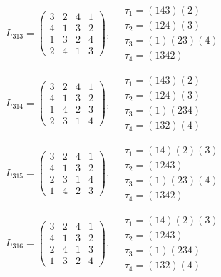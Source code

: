 $L_{313} = \begin{pmatrix} 3 & 2 & 4 & 1 \\ 4 & 1 & 3 & 2 \\ 1 & 3 & 2 & 4 \\ 2 & 4 & 1 & 3 \end{pmatrix}, \quad \begin{matrix} \tau_{1} = (1 4 3)(2) \\ \tau_{2} = (1 2 4)(3) \\ \tau_{3} = (1)(2 3)(4) \\ \tau_{4} = (1 3 4 2) \end{matrix}$

$L_{314} = \begin{pmatrix} 3 & 2 & 4 & 1 \\ 4 & 1 & 3 & 2 \\ 1 & 4 & 2 & 3 \\ 2 & 3 & 1 & 4 \end{pmatrix}, \quad \begin{matrix} \tau_{1} = (1 4 3)(2) \\ \tau_{2} = (1 2 4)(3) \\ \tau_{3} = (1)(2 3 4) \\ \tau_{4} = (1 3 2)(4) \end{matrix}$

$L_{315} = \begin{pmatrix} 3 & 2 & 4 & 1 \\ 4 & 1 & 3 & 2 \\ 2 & 3 & 1 & 4 \\ 1 & 4 & 2 & 3 \end{pmatrix}, \quad \begin{matrix} \tau_{1} = (1 4)(2)(3) \\ \tau_{2} = (1 2 4 3) \\ \tau_{3} = (1)(2 3)(4) \\ \tau_{4} = (1 3 4 2) \end{matrix}$

$L_{316} = \begin{pmatrix} 3 & 2 & 4 & 1 \\ 4 & 1 & 3 & 2 \\ 2 & 4 & 1 & 3 \\ 1 & 3 & 2 & 4 \end{pmatrix}, \quad \begin{matrix} \tau_{1} = (1 4)(2)(3) \\ \tau_{2} = (1 2 4 3) \\ \tau_{3} = (1)(2 3 4) \\ \tau_{4} = (1 3 2)(4) \end{matrix}$

